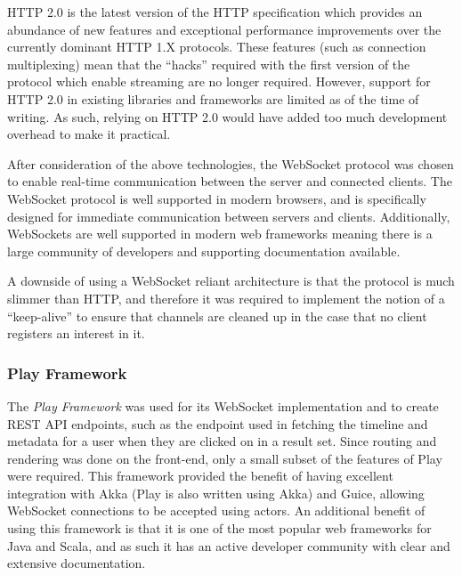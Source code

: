 \documentclass{l4proj}
\begin{document}
        HTTP 2.0 is the latest version of the HTTP specification which provides an abundance of new features and exceptional performance improvements over the currently dominant HTTP 1.X protocols. These features (such as connection multiplexing) mean that the ``hacks'' required with the first version of the protocol which enable streaming are no longer required. However, support for HTTP 2.0 in existing libraries and frameworks are limited as of the time of writing. As such, relying on HTTP 2.0 would have added too much development overhead to make it practical.
        
       After consideration of the above technologies, the WebSocket protocol was chosen to enable real-time communication between the server and connected clients. The WebSocket protocol is well supported in modern browsers, and is specifically designed for immediate communication between servers and clients. Additionally, WebSockets are well supported in modern web frameworks meaning there is a large community of developers  and supporting documentation available.
          
        A downside of using a WebSocket reliant architecture is that the protocol is much slimmer than HTTP, and therefore it was required to implement the notion of a ``keep-alive'' to ensure that channels are cleaned up in the case that no client registers an interest in it.
        
                \subsubsection{Play Framework}
        The \textit{Play Framework} was used for its WebSocket implementation and to create REST API endpoints, such as the endpoint used in fetching the timeline and metadata for a user when they are clicked on in a result set. Since routing and rendering was done on the front-end, only a small subset of the features of Play were required. This framework provided the benefit of having excellent integration with Akka (Play is also written using Akka) and Guice, allowing WebSocket connections to be accepted using actors. An additional benefit of using this framework is that it is one of the most popular web frameworks for Java and Scala, and as such it has an active developer community with clear and extensive documentation.
        
\end{document}
